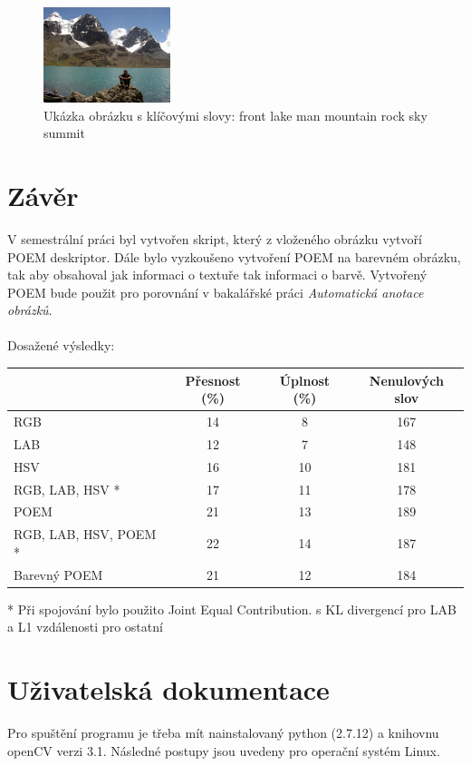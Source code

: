 \documentclass{report}
\begin{document}
\begin{figure}[h]
		\centering
		\includegraphics[width=140px]{./img/iaprtc12.jpg}	
		\caption{Ukázka obrázku s klíčovými slovy: front lake man mountain rock sky summit}
\end{figure}
 
\chapter{Závěr}
V semestrální práci byl vytvořen skript, který z vloženého obrázku vytvoří POEM deskriptor. Dále bylo vyzkoušeno vytvoření POEM na barevném obrázku, tak aby obsahoval jak informaci o textuře tak informaci o barvě. Vytvořený POEM bude použit pro porovnání v bakalářské práci \textit{Automatická anotace obrázků}. \\
\\
Dosažené výsledky: \\

\begin{tabular}{l*{3}{c}}
	          		& Přesnost (\%) & Úplnost (\%) & Nenulových slov \\
\hline
RGB						& 14 & 8 & 167 \\
LAB	  			  		& 12 & 7 & 148  \\
HSV            			& 16 & 10 & 181  \\
RGB, LAB, HSV *    		& 17 & 11 & 178  \\
POEM		     		& 21 & 13 & 189  \\
RGB, LAB, HSV, POEM *	& 22 & 14 & 187  \\
Barevný POEM			& 21 & 12 & 184  \\
\end{tabular}

\vspace{1cm}
* Při spojování bylo použito Joint Equal Contribution. \cite{JEC} s KL divergencí pro LAB a L1 vzdálenosti pro ostatní

\chapter{Uživatelská dokumentace}
Pro spuštění programu je třeba mít nainstalovaný python (2.7.12) a knihovnu openCV verzi 3.1. Následné postupy jsou uvedeny pro operační systém Linux.
\end{document}
